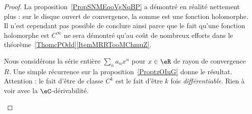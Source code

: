 \begin{proof}
	La proposition~\ref{PropSNMEooVgNqBP} a démontré en réalité nettement plus : sur le disque ouvert de convergence, la somme est une fonction holomorphe. Il n'est cependant pas possible de conclure ainsi parce que le fait qu'une fonction holomorphe est \( C^{\infty}\) ne sera démontré qu'au coût de nombreux efforts dans le théorème~\ref{ThomcPOdd}\ref{ItemMRRTooMChmuZ}.

	\begin{subproof}
		Nous considérons la série entière \( \sum_na_nx^n\) pour \( x\in \eR\) de rayon de convergence \( R\). Une simple récurrence sur la proposition~\ref{ProptzOIuG} donne le résultat.
		Attention : le fait d'être de classe \( C^k\) est le fait d'être \( k\) fois \emph{différentiable}. Rien à voir avec la \( \eC\)-dérivabilité.


\end{subproof}
\end{proof}
